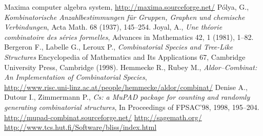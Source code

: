 \documentclass[10pt]{article}
\newcommand{\LINK}[1]{\href{#1}{#1}}
\begin{document}
\begin{thebibliography}{10}

 Maxima computer algebra system,
	\LINK{http://maxima.sourceforge.net/}
 P\'olya, G., {\em Kombinatorische Anzahlbestimmungen
	f\"ur Gruppen, Graphen und chemische Verbindungen},
	Acta Math. 68 (1937), 145--254.
 Joyal, A., {\em Une th\'eorie combinatoire des
	s\'eries formelles}, Advances in Mathematics 42, 1 (1981), 1--82.
  Bergeron F., Labelle G., Leroux P.,
	{\em Combinatorial Species and Tree-Like Structures}
	Encyclopedia of Mathematics and Its Applications 67,
	Cambridge University Press, Cambridge (1998).
 Hemmecke R., Rubey M.,
	{\em Aldor--Combinat: An Implementation of Combinatorial Species},\\
	\LINK{http://www.risc.uni-linz.ac.at/people/hemmecke/aldor/combinat/}
 Denise A., Dutour I., Zimmermann P.,
	{\em Cs: a MuPAD package for counting and randomly generating
	combinatorial structures},
	In Proceedings of FPSAC'98, 1998, 195--204.
 \LINK{http://mupad-combinat.sourceforge.net/}
 \LINK{http://sagemath.org/}
 \LINK{http://www.tcs.hut.fi/Software/bliss/index.html}

\end{thebibliography}
\end{document}
